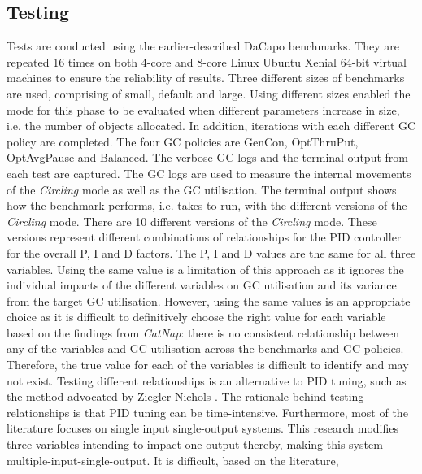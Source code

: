 \subsection{Testing}
Tests are conducted using the earlier-described DaCapo benchmarks. They
are repeated 16 times on both 4-core and 8-core Linux Ubuntu Xenial 64-bit
virtual machines to ensure the reliability of results. Three different sizes
of benchmarks are used, comprising of small, default and large. Using
different sizes enabled the mode for this phase to be evaluated when
different parameters increase in size, i.e. the number of objects
allocated. In addition, iterations with each different GC policy are
completed. The four GC policies are GenCon, OptThruPut, OptAvgPause and Balanced.
\newline\newline
The verbose GC logs and the terminal output from each test are captured.
The GC logs are used to measure the internal movements of the
\emph{Circling} mode as well as the GC utilisation. The terminal output
shows how the benchmark performs, i.e. takes to run, with the different
versions of the \emph{Circling} mode.
\newline\newline
There are 10 different versions of the \emph{Circling} mode. These
versions represent different combinations of relationships for the PID
controller for the overall P, I and D factors. The P, I and D values are
the same for all three variables. Using the same value is a limitation
of this approach as it ignores the individual impacts of the different
variables on GC utilisation and its variance from the target GC
utilisation. However, using the same values is an appropriate choice as
it is difficult to definitively choose the right value for each variable
based on the findings from \emph{CatNap}: there is no consistent relationship
between any of the variables and GC utilisation across the benchmarks
and GC policies. Therefore, the true value for each of the variables is
difficult to identify and may not exist.
\newline\newline
Testing different relationships is an alternative to PID tuning, such as
the method advocated by Ziegler-Nichols \cite{he2000pi}. The
rationale behind testing relationships is that PID tuning can be
time-intensive. Furthermore, most of the literature focuses on single
input single-output systems. This research modifies three variables
intending to impact one output thereby, making this system
multiple-input-single-output. It is difficult, based on the literature,
